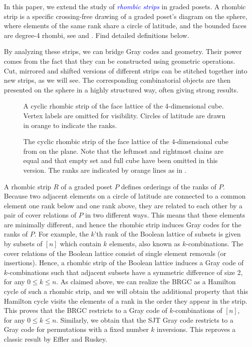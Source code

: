 \documentclass[fontsize=11pt,a4paper,DIV=12]{scrartcl}
\newcommand{\defn}[1]{\textsl{\textcolor{Blue}{#1}}}
\begin{document}
In this paper, we extend the study of \defn{rhombic strips} in graded posets. A rhombic strip is a specific crossing-free drawing of a graded poset's diagram on the sphere, where elements of the same rank share a circle of latitude, and the bounded faces are degree-4 rhombi, see  and . Find detailed definitions below.

By analyzing these strips, we can bridge Gray codes and geometry. Their power comes from the fact that they can be constructed using geometric operations. Cut, mirrored and shifted versions of different strips can be stitched together into new strips, as we will see. The corresponding combinatorial objects are then presented on the sphere in a highly structured way, often giving strong results.

\begin{figure}
    \centering
    
    \caption{A cyclic rhombic strip of the face lattice of the 4-dimensional cube. Vertex labels are omitted for visibility. Circles of latitude are drawn in orange to indicate the ranks.}
    \label{fig:B4 on sphere}
\end{figure}

\begin{figure}
    \centering
    \makebox[\textwidth][c]{
        
    }
    \caption{The cyclic rhombic strip of the face lattice of the 4-dimensional cube from  on the plane. Note that the leftmost and rightmost chains are equal and that empty set and full cube have been omitted in this version. The ranks are indicated by orange lines as in .}
    \label{fig:B4 on plane}
\end{figure}

A rhombic strip $R$ of a graded poset $P$ defines orderings of the ranks of $P$. Because two adjacent elements on a circle of latitude are connected to a common element one rank below and one rank above, they are related to each other by a pair of cover relations of $P$ in two different ways. This means that these elements are minimally different, and hence the rhombic strip induces Gray codes for the ranks of $P$. For example, the $k$'th rank of the Boolean lattice of subsets is given by subsets of $[n]$ which contain $k$ elements, also known as $k$-combinations. The cover relations of the Boolean lattice consist of single element removals (or insertions). Hence, a rhombic strip of the Boolean lattice induces a Gray code of $k$-combinations such that adjacent subsets have a symmetric difference of size 2, for any $0\le k\le n$. As claimed above, we can realize the BRGC as a Hamilton cycle of such a rhombic strip, and we will obtain the additional property that this Hamilton cycle visits the elements of a rank in the order they appear in the strip. This proves that the BRGC restricts to a Gray code of $k$-combinations of $[n]$, for any $0\le k\le n$. Similarly, we obtain that the SJT Gray code restricts to a Gray code for permutations with a fixed number $k$ inversions. This reproves a classic result by Effler and Ruskey\cite{fixedinversions}. 
\end{document}
